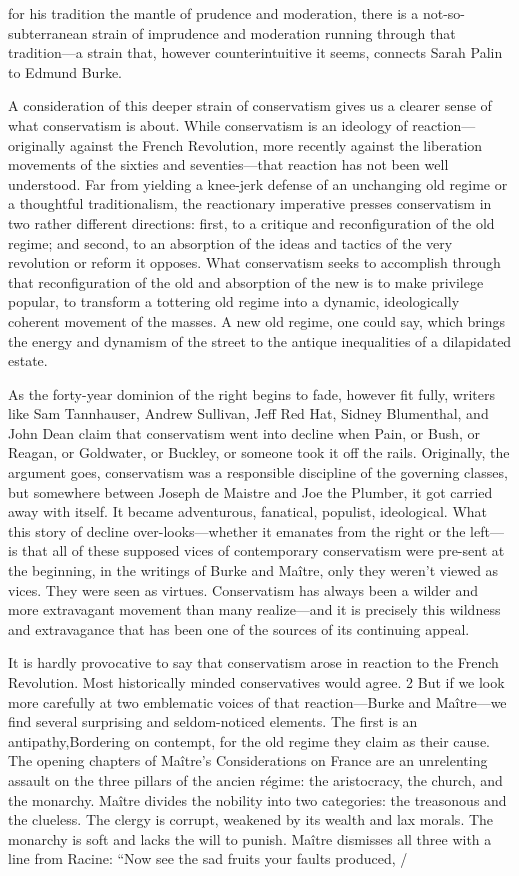 for his tradition the mantle of prudence and moderation, there is a not-so-subterranean strain of imprudence and moderation running through that tradition—a strain that, however counterintuitive it seems, connects Sarah Palin to Edmund Burke.{\par} A consideration of this deeper strain of conservatism gives us a clearer sense of what conservatism is about. While conservatism is an ideology of reaction—originally against the French Revolution, more recently against the liberation movements of the sixties and seventies—that reaction has not been well understood. Far from yielding a knee-jerk defense of an unchanging old regime or a thoughtful traditionalism, the reactionary imperative presses conservatism in two rather different directions: first, to a critique and reconfiguration of the old regime; and second, to an absorption of the ideas and tactics of the very revolution or reform it opposes. What conservatism seeks to accomplish through that reconfiguration of the old and absorption of the new is to make privilege popular, to transform a tottering old regime into a dynamic, ideologically coherent movement of the masses. A new old regime, one could say, which brings the energy and dynamism of the street to the antique inequalities of a dilapidated estate.{\par} As the forty-year dominion of the right begins to fade, however fit fully, writers like Sam Tannhauser, Andrew Sullivan, Jeff Red Hat, Sidney Blumenthal, and John Dean claim that conservatism went into decline when Pain, or Bush, or Reagan, or Goldwater, or Buckley, or someone took it off the rails. Originally, the argument goes, conservatism was a responsible discipline of the governing classes, but somewhere between Joseph de Maistre and Joe the Plumber, it got carried away with itself. It became adventurous, fanatical, populist, ideological. What this story of decline over-looks—whether it emanates from the right or the left—is that all of these supposed vices of contemporary conservatism were pre-sent at the beginning, in the writings of Burke and Maître, only they weren’t viewed as vices. They were seen as virtues. Conservatism has always been a wilder and more extravagant movement than many realize—and it is precisely this wildness and extravagance that has been one of the sources of its continuing appeal.{\par} It is hardly provocative to say that conservatism arose in reaction to the French Revolution. Most historically minded conservatives would agree. {\color{blue} 2 } But if we look more carefully at two emblematic voices of that reaction—Burke and Maître—we find several surprising and seldom-noticed elements. The first is an antipathy,Bordering on contempt, for the old regime they claim as their cause. The opening chapters of Maître’s Considerations on France are an unrelenting assault on the three pillars of the ancien régime: the aristocracy, the church, and the monarchy. Maître divides the nobility into two categories: the treasonous and the clueless. The clergy is corrupt, weakened by its wealth and lax morals. The monarchy is soft and lacks the will to punish. Maître dismisses all three with a line from Racine: “Now see the sad fruits your faults produced, / 